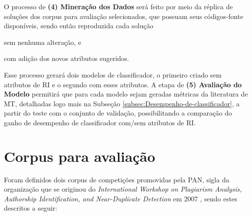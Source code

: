     O processo de \textbf{(4) Mineração dos Dados} será feito por meio da réplica de soluções dos corpus para avaliação selecionados, que possuam seus códigos-fonte disponíveis, sendo então reproduzida cada solução 
    \begin{enumerate*}[label=(\alph*)]
        \item sem nenhuma alteração, e 
        \item com adição dos novos atributos sugeridos.
    \end{enumerate*}
    Esse processo gerará dois modelos de classificador, o primeiro criado sem atributos de RI e o segundo com esses atributos.
    A etapa de \textbf{(5) Avaliação do Modelo} permitirá que para cada modelo sejam geradas métricas da literatura de MT, detalhadas logo mais na Subseção \ref{subsec:Desempenho-de-classificador}, a partir do teste com o conjunto de validação, possibilitando a comparação do ganho de desempenho de classificador com/sem atributos de RI.
    
    
    

\section{Corpus para avaliação}  \label{sec:Corpus-para-avaliação}
    Foram definidos dois corpus de competições promovidas pela PAN, sigla da organização que se originou do \textit{International Workshop on Plagiarism Analysis, Authorship Identification, and Near-Duplicate Detection} em 2007 \cite{PAN_Workshop_2007}, sendo estes descritos a seguir:%
    
